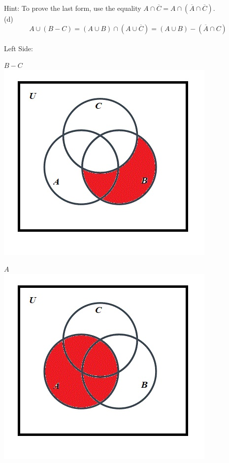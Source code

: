 \documentclass[10pt]{article}
\begin{document}
Hint: To prove the last form, use the equality $A \cap \overline{C} = A \cap (\overline{A} \cap \overline{C})$.\\

(d)
$$A \cup (B - C) = (A \cup B) \cap (A \cup \overline{C}) = (A \cup B) - (\overline{A} \cap C)$$\\

Left Side:

$B - C$\\
\includegraphics[scale=0.55]{26}

$A$\\
\includegraphics[scale=0.55]{12}
\end{document}
